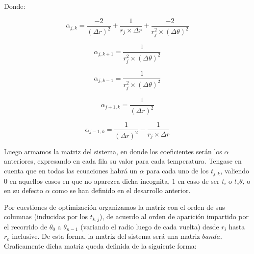 Donde:

\begin{equation}
\alpha_{j,k} = \frac{-2}{(\Delta r)^2} + \frac{1}{r_j \times \Delta r} + \frac{-2}{r_j^2 \times (\Delta \theta)^2}
\end{equation}

\begin{equation}
\alpha_{j,k+1} = \frac{1}{r_j^2 \times (\Delta \theta)^2}
\end{equation}

\begin{equation}
\alpha_{j,k-1} = \frac{1}{r_j^2 \times (\Delta \theta)^2}
\end{equation}

\begin{equation}
\alpha_{j+1,k} = \frac{1}{(\Delta r)^2}
\end{equation}

\begin{equation}
\alpha_{j-1,k} = \frac{1}{(\Delta r)^2} - \frac{1}{r_j \times \Delta r}
\end{equation}

\vspace{5mm}

Luego armamos la matriz del sistema, en donde los coeficientes ser\'an los $\alpha$ anteriores, expresando en cada fila su valor para cada temperatura. Tengase en cuenta que en todas las ecuaciones habr\'a un $\alpha$ para cada uno de los $t_{j,k}$, valiendo $0$ en aquellos casos en que no aparezca dicha incognita, $1$ en caso de ser $t_i$ o $t_e{\theta}$, o en su defecto $\alpha$ como se han definido en el desarrollo anterior.

Por cuestiones de optimizaci\'on organizamos la matriz con el orden de sus columnas (inducidas por los $t_{k,j}$), de acuerdo al orden de aparici\'on impartido por el recorrido de $\theta_0$ a $\theta_{n-1}$ (variando el radio luego de cada vuelta) desde $r_i$ hasta $r_e$ inclusive. De esta forma, la matriz del sistema ser\'a una matriz $banda$.
\\
Graficamente dicha matriz queda definida de la siguiente forma:
\\


